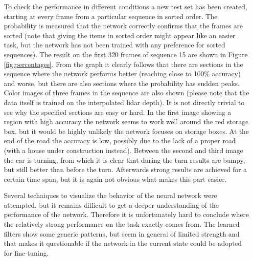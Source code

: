 To check the performance in different conditions a new test set has been created, starting at every frame from a particular sequence in sorted order. The probability is measured that the network correctly confirms that the frames are sorted (note that giving the items in sorted order might appear like an easier task, but the network has not been trained with any preference for sorted sequences). The result on the first 320 frames of sequence 15 are shown in Figure \ref{fig:percentages}. From the graph it clearly follows that there are  sections in the sequence where the network performs better (reaching close to 100\% accuracy) and worse, but there are also sections where the probability has sudden peaks. Color images of three frames in the sequence are also shown (please note that the data itself is trained on the interpolated lidar depth). It is not directly trivial to see why the specified sections are easy or hard. In the first image showing a region with high accuracy the network seems to work well around the red storage box, but it would be highly unlikely the network focuses on storage boxes. At the end of the road the accuracy is low, possibly due to the lack of a proper road (with a house under construction instead). Between the second and third image the car is turning, from which it is clear that during the turn results are bumpy, but still better than before the turn. Afterwards strong results are achieved for a certain time span, but it is again not obvious what makes this part easier. 

Several techniques to visualize the behavior of the neural network were attempted, but it remains difficult to get a deeper understanding of the performance of the network. Therefore it is unfortunately hard to conclude where the relatively strong performance on the task exactly comes from. The learned filters show some generic patterns, but seem in general of limited strength and that makes it questionable if the network in the current state could be adopted for fine-tuning.


